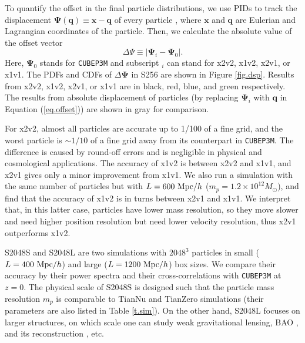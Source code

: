 \documentclass[10pt,twocolumn,preprint]{emulateapj}
\newcommand{\bs}{\boldsymbol}
\newcommand{\Msun}{M_\odot}
\begin{document}
To quantify the offset in the final particle distributions, we use PIDs to track the displacement ${\bs \Psi}({\bs q})\equiv{\bs x}-{\bs q}$ of every particle \citep{2017PhRvD..95d3501Y}, where ${\bs x}$ and ${\bs q}$ are Eulerian and Lagrangian coordinates of the particle. Then, we calculate the absolute value of the offset vector
\begin{equation}\label{eq.offset}
	\Delta\Psi\equiv|{\bs\Psi}_i-{\bs\Psi}_0|.
\end{equation}
Here, ${\bs\Psi}_0$ stands for {\tt CUBEP3M} and subscript $_i$ can stand for x2v2, x1v2, x2v1, or x1v1. The PDFs and CDFs of $\Delta\bs\Psi$ in S256 are shown in Figure \ref{fig.dsp}. Results from x2v2, x1v2, x2v1, or x1v1 are in black, red, blue, and green respectively. The results from absolute displacement of particles (by replacing ${\bs\Psi}_i$ with ${\bs q}$ in Equation (\ref{eq.offset})) are shown in gray for comparison.

For x2v2, almost all particles are accurate up to 1/100 of a fine grid, and the worst particle is $\sim 1/10$ of a fine grid away from its counterpart in {\tt CUBEP3M}. The difference is caused by round-off errors and is negligible in physical and cosmological applications. The accuracy of x1v2 is between x2v2 and x1v1, and x2v1 gives only a minor improvement from x1v1. We also run a simulation with the same number of particles but with $L=600\ {\rm Mpc}/h$ ($m_p=1.2\times 10^{12}\Msun$), and find that the accuracy of x1v2 is in turns between x2v1 and x1v1. We interpret that, in this latter case, particles have lower mass resolution, so they move slower and need higher position resolution but need lower velocity resolution, thus x2v1 outperforms x1v2.

S2048S and S2048L are two simulations with $2048^3$ particles in small ($L=400\ {\rm Mpc}/h$) and large ($L=1200\ {\rm Mpc}/h$) box sizes. We compare their accuracy by their power spectra and their cross-correlations with {\tt CUBEP3M} at $z=0$. The physical scale of S2048S is designed such that the particle mass resolution $m_p$ is comparable to TianNu and TianZero simulations (their parameters are also listed in Table \ref{t.sim}). On the other hand, S2048L focuses on larger structures, on which scale one can study weak gravitational lensing, BAO \citep{2005ApJ...633..560E}, and its reconstruction \citep{2007ApJ...664..675E,2017ApJ...841L..29W}, etc.
\end{document}
